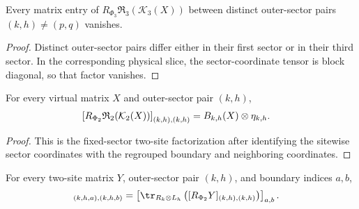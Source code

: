 \begin{lemma}
    \label{thm:mpdo_regrouped_three_site_closure_off_diagonal}
    \leanok
    Every matrix entry of
    $R_{\Phi_3}\mathfrak R_3(\mathcal K_3(X))$ between distinct outer-sector
    pairs $(k,h)\ne(p,q)$ vanishes.
\end{lemma}

\begin{proof}
    \leanok
    Distinct outer-sector pairs differ either in their first sector or in
    their third sector. In the corresponding physical slice, the
    sector-coordinate tensor is block diagonal, so that factor vanishes.
\end{proof}

\begin{lemma}
    \label{thm:mpdo_t0_regrouped_two_site_closure_block}
    \leanok
    For every virtual matrix $X$ and outer-sector pair $(k,h)$,
    \begin{align}
        \left[R_{\Phi_2}\mathfrak R_2(\mathcal K_2(X))\right]_{(k,h),(k,h)}
         & =B_{k,h}(X)\otimes\eta_{k,h}.
        \notag
    \end{align}
\end{lemma}

\begin{proof}
    \leanok
    This is the fixed-sector two-site factorization after identifying the
    sitewise sector coordinates with the regrouped boundary and neighboring
    coordinates.
\end{proof}

\begin{lemma}
    \label{thm:mpdo_t0_same_block_action}
    \leanok
    For every two-site matrix $Y$, outer-sector pair $(k,h)$, and boundary
    indices $a,b$,
    \begin{align}
        [\mathcal T_0(Y)]_{(k,h,a),(k,h,b)}
         & =
        \left[\tr_{R_k\otimes L_h}
            \left([R_{\Phi_2}Y]_{(k,h),(k,h)}\right)\right]_{a,b}.
        \notag
    \end{align}
\end{lemma}

